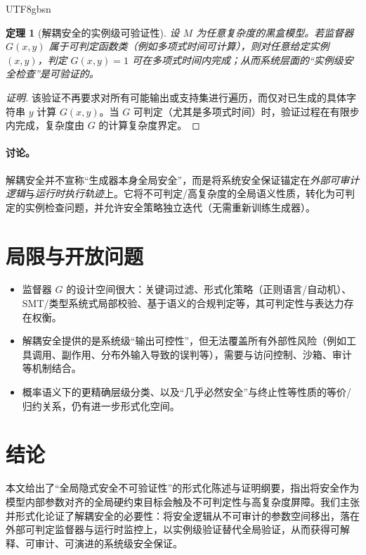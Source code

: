 \documentclass[letterpaper,twocolumn,10pt]{article}
\newtheorem{theorem}{定理}
\begin{document}
\begin{CJK}{UTF8}{gbsn}
\begin{theorem}[解耦安全的实例级可验证性]\label{thm:decoupled}
设 $M$ 为任意复杂度的黑盒模型。若监督器 $G(x,y)$ 属于可判定函数类（例如多项式时间可计算），则对任意给定实例 $(x,y)$，判定 $G(x,y)=1$ 可在多项式时间内完成；从而系统层面的“实例级安全检查”是可验证的。
\end{theorem}

\begin{proof}[证明]
该验证不再要求对所有可能输出或支持集进行遍历，而仅对已生成的具体字符串 $y$ 计算 $G(x,y)$。当 $G$ 可判定（尤其是多项式时间）时，验证过程在有限步内完成，复杂度由 $G$ 的计算复杂度界定。
\end{proof}

\paragraph{讨论。}
解耦安全并不宣称“生成器本身全局安全”，而是将系统安全保证锚定在\emph{外部可审计逻辑}与\emph{运行时执行轨迹}上。它将不可判定/高复杂度的全局语义性质，转化为可判定的实例检查问题，并允许安全策略独立迭代（无需重新训练生成器）。

\section{局限与开放问题}
\begin{itemize}[leftmargin=*,itemsep=0.2em]
  \item 监督器 $G$ 的设计空间很大：关键词过滤、形式化策略（正则语言/自动机）、SMT/类型系统式局部校验、基于语义的合规判定等，其可判定性与表达力存在权衡。
  \item 解耦安全提供的是系统级“输出可控性”，但无法覆盖所有外部性风险（例如工具调用、副作用、分布外输入导致的误判等），需要与访问控制、沙箱、审计等机制结合。
  \item 概率语义下的更精确层级分类、以及“几乎必然安全”与终止性等性质的等价/归约关系，仍有进一步形式化空间。
\end{itemize}

\section{结论}
本文给出了“全局隐式安全不可验证性”的形式化陈述与证明纲要，指出将安全作为模型内部参数对齐的全局硬约束目标会触及不可判定性与高复杂度屏障。我们主张并形式化论证了解耦安全的必要性：将安全逻辑从不可审计的参数空间移出，落在外部可判定监督器与运行时监控上，以实例级验证替代全局验证，从而获得可解释、可审计、可演进的系统级安全保证。


\end{CJK}
\end{document}
